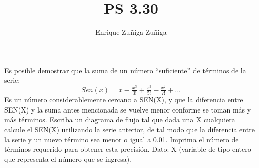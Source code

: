 \documentclass[11pt]{amsart}
\title{PS 3.30}
\author{Enrique Zuñiga Zuñiga}
\begin{document}
\maketitle
\noindent Es posible demostrar que la suma de un número “suficiente” de términos de la serie:\newline\newline
$$Sen(x) = x-\tfrac{x^3}{3!} +\tfrac{x^5}{5!}-\tfrac{x^7}{7!}+ . . . $$\newline\newline
Es un número considerablemente cercano a SEN(X), y que la diferencia entre SEN(X) y la suma antes mencionada se vuelve menor conforme se toman más y más términos. Escriba un diagrama de flujo tal que dada una X cualquiera calcule el SEN(X) utilizando la serie anterior, de tal modo que la diferencia entre la serie y un nuevo término sea menor o igual a 0.01. Imprima el número de términos requerido para obtener esta precisión.\newline\newline
Dato: X (variable de tipo entero que representa el número que se ingresa).\newline
\end{document}
